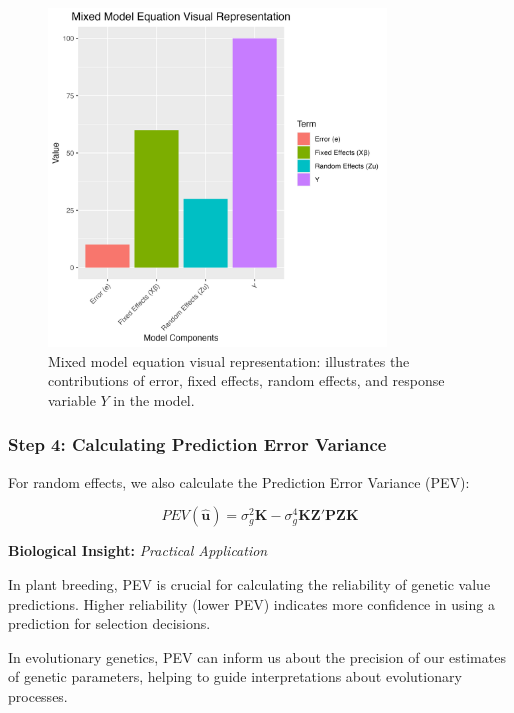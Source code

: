 \documentclass[12pt,a4paper]{article}
\newenvironment{biologicalinsightbox}[1][]
{\begin{basebox}[linecolor=uqpurple]
\textbf{\color{uqpurple}Biological Insight:} \textit{#1}\par\noindent\ignorespaces}
{\end{basebox}}
\begin{document}
\begin{figure}[h]
    \centering
    \includegraphics[width=0.8\textwidth]{mixed_model_visual.png}
    \caption{Mixed model equation visual representation: illustrates the contributions of error, fixed effects, random effects, and response variable \( Y \) in the model.}
    \label{fig:mixed-model-visual}
\end{figure}

\subsubsection{Step 4: Calculating Prediction Error Variance}

For random effects, we also calculate the Prediction Error Variance (PEV):

\[
PEV(\hat{\mathbf{u}}) = \sigma^2_g\mathbf{K} - \sigma^4_g\mathbf{K}\mathbf{Z'P}\mathbf{Z}\mathbf{K}
\]

\begin{biologicalinsightbox}[Practical Application]
In plant breeding, PEV is crucial for calculating the reliability of genetic value predictions. Higher reliability (lower PEV) indicates more confidence in using a prediction for selection decisions.

In evolutionary genetics, PEV can inform us about the precision of our estimates of genetic parameters, helping to guide interpretations about evolutionary processes.
\end{biologicalinsightbox}
\end{document}
